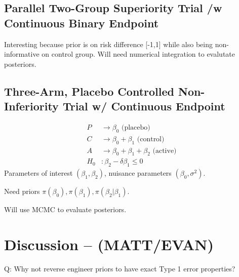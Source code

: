 \documentclass[12pt]{article}
\begin{document}
\subsection{Parallel Two-Group Superiority Trial /w Continuous Binary Endpoint}
Interesting because prior is on risk difference [-1,1] while also being non-informative on control group. Will need numerical integration to evalutate posteriors.
\subsection{Three-Arm, Placebo Controlled Non-Inferiority Trial w/ Continuous Endpoint}
\begin{align*}
P&\rightarrow\beta_0 \text{ (placebo)}\\
C&\rightarrow\beta_0+\beta_1 \text{ (control)}\\
A&\rightarrow\beta_0+\beta_1+\beta_2 \text{ (active)}\\
H_0&:\beta_2-\delta\beta_1\leq 0
\end{align*}
Parameters of interest $(\beta_1,\beta_2)$, nuisance parameters $(\beta_0,\sigma^2)$.

Need priors $\pi(\beta_0), \pi(\beta_1), \pi(\beta_2|\beta_1)$. 

Will use MCMC to evaluate posteriors.
\section{Discussion -- (MATT/EVAN)}
Q: Why not reverse engineer priors to have exact Type 1 error properties?
\end{document}
